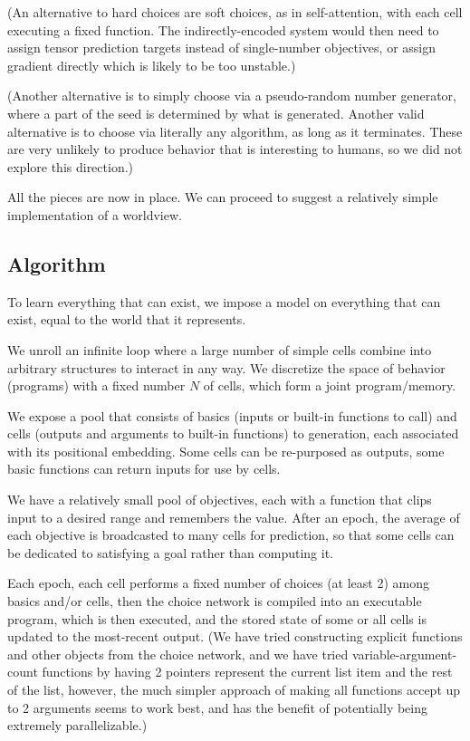 \documentclass{article}
\begin{document}
(An alternative to hard choices are soft choices, as in self-attention, with each cell executing a fixed function. The indirectly-encoded system would then need to assign tensor prediction targets instead of single-number objectives, or assign gradient directly which is likely to be too unstable.)

(Another alternative is to simply choose via a pseudo-random number generator, where a part of the seed is determined by what is generated. Another valid alternative is to choose via literally any algorithm, as long as it terminates. These are very unlikely to produce behavior that is interesting to humans, so we did not explore this direction.)

All the pieces are now in place. We can proceed to suggest a relatively simple implementation of a worldview.

\subsection{Algorithm\label{Algorithm}}

To learn everything that can exist, we impose a model on everything that can exist, equal to the world that it represents.

We unroll an infinite loop where a large number of simple cells combine into arbitrary structures to interact in any way. We discretize the space of behavior (programs) with a fixed number $N$ of cells, which form a joint program/memory.

We expose a pool that consists of basics (inputs or built-in functions to call) and cells (outputs and arguments to built-in functions) to generation, each associated with its positional embedding. Some cells can be re-purposed as outputs, some basic functions can return inputs for use by cells.

We have a relatively small pool of objectives, each with a function that clips input to a desired range and remembers the value. After an epoch, the average of each objective is broadcasted to many cells for prediction, so that some cells can be dedicated to satisfying a goal rather than computing it.

Each epoch, each cell performs a fixed number of choices (at least 2) among basics and/or cells, then the choice network is compiled into an executable program, which is then executed, and the stored state of some or all cells is updated to the most-recent output. (We have tried constructing explicit functions and other objects from the choice network, and we have tried variable-argument-count functions by having 2 pointers represent the current list item and the rest of the list, however, the much simpler approach of making all functions accept up to 2 arguments seems to work best, and has the benefit of potentially being extremely parallelizable.)
\end{document}
